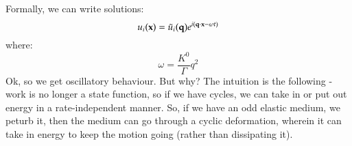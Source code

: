 Formally, we can write solutions:
\begin{equation}
    u_i(\mathbf{x}) = \tilde{u}_i(\mathbf{q})e^{i(\mathbf{q} \cdot \mathbf{x} - \omega t)}
\end{equation}
where:
\begin{equation}
    \omega = \frac{K^0}{\Gamma}q^2
\end{equation}
Ok, so we get oscillatory behaviour. But why? The intuition is the following - work is no longer a state function, so if we have cycles, we can take in or put out energy in a rate-independent manner. So, if we have an odd elastic medium, we peturb it, then the medium can go through a cyclic deformation, wherein it can take in energy to keep the motion going (rather than dissipating it).
